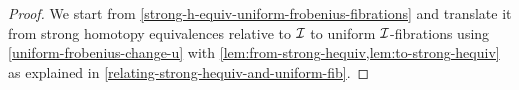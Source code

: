 \documentclass[reqno,10pt,a4paper,oneside,draft]{amsart}
\begin{document}
\begin{proof}
We start from \cref{strong-h-equiv-uniform-frobenius-fibrations} and translate it from strong homotopy equivalences relative to $\cal{I}$ to uniform $\cal{I}$-fibrations using \cref{uniform-frobenius-change-u} with \cref{lem:from-strong-hequiv,lem:to-strong-hequiv} as explained in \cref{relating-strong-hequiv-and-uniform-fib}.
\begin{comment}
For the benefit of intuition, let us make this explicit for a single right $\liftr{(\cal{I}_{\otimes})}$-map $p \co X \to Y$.

We assume that the pullback along $p$ lifts to a functor
\[
\xymatrix@C+2em{
  \cal{I}_{/Y}
  \ar[r]^{p^*}
  \ar[d]_{u_{/Y}}
&
  \liftl{(\liftr{\cal{I}_{/X}})}
  \ar[d]^{\liftl{(\liftr{u_{/X}})}}
\\
  \catE_{/Y}^\to
  \ar[r]_{p^*}
&
  \catE_{/X}^\to
\rlap{.}}
\]
We will show that $p^*$ also lifts to a functor
\[
\xymatrix@C+2em{
  {\cal{I}_\otimes}_{/Y}
  \ar[r]^{p^*}
  \ar[d]_{u_{\otimes}/Y}
&
  \liftl{(\liftr{{\cal{I}_{\otimes}}_{/X}})}
  \ar[d]^{\liftl{(\liftr{{u_{\otimes}}_{/X}}})}
\\
  \catE_{/Y}^\to \ar[r]_{p^*}
&
  \catE_{/X}^\to \rlap{.}
}
\]
which implies the claim by \cref{retract-closure}.
By the definiton of $u_\otimes \co \cal{I} \to \catE^\to$, as given in~\eqref{equ:u-tensor}, it suffices to separately show that $p^*$ lifts to functors
\[
\xymatrix@C+2em{
  \cal{I}_{/Y}
  \ar[r]^{p^*}
  \ar[d]_{(\kcyl \hatotimes u)_{/Y}}
&
  \liftl{(\liftr{\cal{I}_{/X}})}
  \ar[d]^{\liftl{(\liftr{(\kcyl \hatotimes u)_{/X}}})}
\\
  \catE_{/Y}^\to
  \ar[r]_{p^*}
&
  \catE_{/X}^\to
\rlap{,}}
\]
for $k \in \braces{0, 1}$.
Since a uniform $\cal{I}$-fibration is in particular a $(\kcyl \otimes \id_\catE)$-right map, we can apply \cref{strong-h-equiv-base-change-along-fibration} and observe that the pullback functor lifts as follows:
\[
\xymatrix@C+2em{
  \cal{S}_k(\cal{I}_{/Y})
  \ar[r]^{G}
  \ar[d]
&
  \liftl{(\liftr{\cal{S}_k(\cal{I}_{/X})})}
  \ar[d]
\\
  \catE_{/Y}^\to
  \ar[r]_{p^*}
&
  \catE_{/X}^\to
\rlap{.}}
\]
Composing this with the the functors of \cref{lem:from-strong-hequiv,lem:to-strong-hequiv}, we obtain
\[
\xymatrix{
  \cal{I}_{/Y}
  \ar[rr]^{M_{/Y}}
  \ar[dr]_{(\kcyl \hatotimes u)_{/Y}}
&&
  \cal{S}_k(\cal{I}_{/Y})
  \ar[r]
  \ar[dl]
&
  \liftl{(\liftr{\cal{S}_k(\cal{I}_{/X})})}
  \ar[rr]^{\liftl{(\liftr{L_{/X}})}}
  \ar[dr]
&&
  \liftl{(\liftr{\cal{I}_{/X}})}
  \ar[dl]^{\liftl{(\liftr{(\kcyl \hatotimes u)_{/X}}})}
\\ &
  \catE_{/Y}^\to
  \ar[rrr]_{p^*}
&&&
  \catE_{/X}^\to
\rlap{.}}
\]
as required.
Observe that the retract closure of \cref{lem:from-strong-hequiv} vanishes by \cref{retract-closure}.
\end{comment}
\end{proof}
\end{document}
